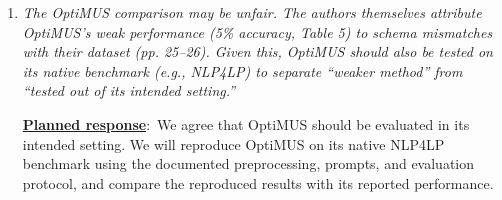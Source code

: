 \documentclass[11pt]{article}
\newcommand{\edit}[1]{{\color{hopkins-blue}\itshape #1}}
\newcommand{\planned}{\noindent\underline{\textbf{Planned response}}:\ }
\newcommand{\expected}{\noindent\textbf{Expected outputs.} }
\begin{document}
\begin{enumerate}[label=(R2.Major.\arabic*),leftmargin=*]




\item \edit{The OptiMUS comparison may be unfair. The authors themselves attribute OptiMUS's weak performance (5\% accuracy, Table 5) to schema mismatches with their dataset (pp. 25--26). Given this, OptiMUS should also be tested on its native benchmark (e.g., NLP4LP) to separate ``weaker method'' from ``tested out of its intended setting.''}\label{R2-major-5}

\planned We agree that OptiMUS should be evaluated in its intended setting.
We will reproduce OptiMUS on its native NLP4LP benchmark using the documented
preprocessing, prompts, and evaluation protocol, and compare the reproduced
results with its reported performance.


\end{enumerate}
\end{document}
